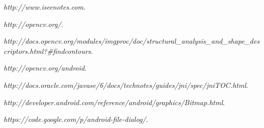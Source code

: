 \documentclass[pdftex,11pt,a4paper]{article}
\begin{document}


\renewcommand{\abstractname}{Executive Summary}

\tableofcontents
\listoffigures
\listoftables







\begin{thebibliography}{9}

  \emph{http://www.iseenotes.com}.

  \emph{http://opencv.org/}.

  \emph{http://docs.opencv.org/modules/imgproc/doc/structural\_analysis\_and\_shape\_descriptors.html?\#findcontours}.

  \emph{http://opencv.org/android}.

  \emph{http://docs.oracle.com/javase/6/docs/technotes/guides/jni/spec/jniTOC.html}.

  \emph{http://developer.android.com/reference/android/graphics/Bitmap.html}.

  \emph{https://code.google.com/p/android-file-dialog/}.

\end{thebibliography}
\end{document}
